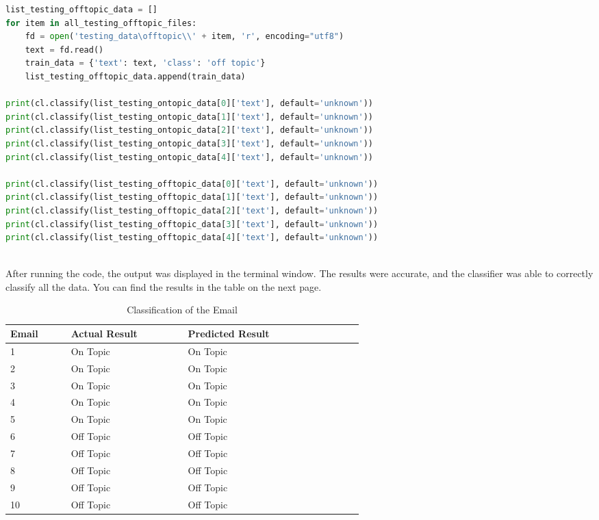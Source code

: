 \documentclass[12pt]{article}
\begin{document}
\begin{lstlisting}[language=Python, caption=Email Classification Using Naive Bayes Classifier]
list_testing_offtopic_data = []
for item in all_testing_offtopic_files:
    fd = open('testing_data\offtopic\\' + item, 'r', encoding="utf8")
    text = fd.read()    
    train_data = {'text': text, 'class': 'off topic'}
    list_testing_offtopic_data.append(train_data)

print(cl.classify(list_testing_ontopic_data[0]['text'], default='unknown'))
print(cl.classify(list_testing_ontopic_data[1]['text'], default='unknown'))
print(cl.classify(list_testing_ontopic_data[2]['text'], default='unknown'))
print(cl.classify(list_testing_ontopic_data[3]['text'], default='unknown'))
print(cl.classify(list_testing_ontopic_data[4]['text'], default='unknown'))

print(cl.classify(list_testing_offtopic_data[0]['text'], default='unknown'))
print(cl.classify(list_testing_offtopic_data[1]['text'], default='unknown'))
print(cl.classify(list_testing_offtopic_data[2]['text'], default='unknown'))
print(cl.classify(list_testing_offtopic_data[3]['text'], default='unknown'))
print(cl.classify(list_testing_offtopic_data[4]['text'], default='unknown'))


\end{lstlisting}
\\
After running the code, the output was displayed in the terminal window. The results were accurate, and the classifier was able to correctly classify all the data. You can find the results in the table on the next page.

\begin{table}[h]
\centering
\caption{Classification of the Email}
\label{tbl:simple}
\begin{tabular}{p{0.10\linewidth}p{0.20\linewidth}p{0.20\linewidth}p{0.10\linewidth}}
\hline
\textbf{Email} & \textbf{Actual Result} & \textbf{Predicted Result}\\ \hline \hline
1   &      On Topic  &       On Topic   \\ \hline
2   &      On Topic  &       On Topic   \\ \hline 
3   &      On Topic  &       On Topic   \\ \hline
4   &      On Topic  &       On Topic   \\ \hline
5   &      On Topic  &       On Topic   \\ \hline
6   &      Off Topic  &       Off Topic   \\ \hline
7   &      Off Topic  &       Off Topic   \\ \hline
8   &      Off Topic  &       Off Topic   \\ \hline
9   &      Off Topic  &       Off Topic   \\ \hline
10   &     Off Topic  &       Off Topic   \\ \hline \hline
\end{tabular}
\end{table}
\end{document}
